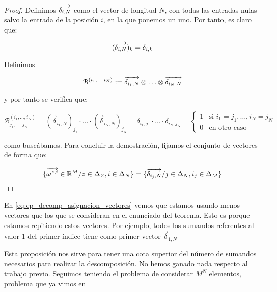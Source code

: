 \begin{proof}
    Definimos $\overrightarrow{\delta_{i, N}}$ como el vector de longitud $N$, con todas las entradas nulas salvo la entrada de la posición $i$, en la que ponemos un uno. Por tanto, es claro que:

    \begin{equation}
        (\overrightarrow{\delta_{i, N}})_k =  \delta_{i, k}
    \end{equation}

    Definimos

    \begin{equation}
        \mathcal{B}^{(i_1, \ldots, i_N)} := \overrightarrow{\delta_{i_1, N}} \otimes \ldots \otimes \overrightarrow{\delta_{i_N, N}}
    \end{equation}

    y por tanto se verifica que:

    \begin{equation}
        \mathcal{B}^{(i_1, \ldots, i_N)}_{j_1, \ldots, j_N} = (\vec{\delta}_{i_1, N})_{j_1} \cdot \ldots \cdot (\vec{\delta}_{i_N, N})_{j_N} = \delta_{i_1, j_1} \cdot \ldots \cdot \delta_{i_N, j_N} =
        \begin{cases}
            1 & \text{si } i_1 = j_1, \ldots, i_N = j_N \\
            0 & \text{en otro caso}
        \end{cases}
    \end{equation}

    como buscábamos. Para concluir la demostración, fijamos el conjunto de vectores de forma que:

    \begin{equation} \label{eq:cp_decomp_asignacion_vectores}
        \{\overrightarrow{\omega^{z, i}} \in \mathbb{R}^M / z \in \Delta_{Z}, i \in \Delta_{N} \} =
        \{ \overrightarrow{\delta_{i_j, N}} / j \in \Delta_{N}, i_j \in \Delta_{M} \}
    \end{equation}

\end{proof}

\begin{observacion}
    En \eqref{eq:cp_decomp_asignacion_vectores} vemos que estamos usando menos vectores que los que se consideran en el enunciado del teorema. Esto es porque estamos repitiendo estos vectores. Por ejemplo, todos los sumandos referentes al valor 1 del primer índice tiene como primer vector $\vec{\delta}_{1, N}$
\end{observacion}

\begin{observacion}
    Esta proposición nos sirve para tener una cota superior del número de sumandos necesarios para realizar la descomposición. No hemos ganado nada respecto al trabajo previo. Seguimos teniendo el problema de considerar $M^N$ elementos, problema que ya vimos en 
\end{observacion}

